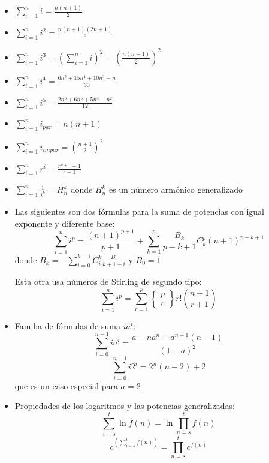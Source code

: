 \begin{itemize}
    \item{
		$ \sum_{i=1}^{n} {i} = \frac{n(n+1)}{2} $	
    }
    \item{
		$ \sum_{i=1}^{n} i^2 = \frac{n(n+1)(2n+1)}{6} $
    }
    \item{
		$ \sum_{i=1}^{n} i^3 = \left( \sum_{i=1}^{n} i \right) ^ 2 = \left( \frac{n(n+1)}{2} \right) ^ 2 $
    }
    \item{
		$ \sum_{i=1}^{n} i^4 = \frac{6n^5 + 15n^4 + 10n^3 - n}{30}$
    }
    \item{
		$ \sum_{i=1}^{n} i^5 = \frac{2n^6 + 6n^5 + 5n^4 - n^2}{12} $
    }
    \item{
		$ \sum_{i=1}^{n} i_{par} = n(n+1) $
    }
    \item{
		$ \sum_{i=1}^{n} i_{impar} = \left( \frac{n+1}{2} \right) ^ 2$
    }
    \item{
		$ \sum_{i=1}^{n} r^i = \frac{r^{n+1} - 1}{r - 1} $
    }
    \item{
		$ \sum_{i=1}^{n} \frac{1}{i^k} = H_n^k $ donde $H_n^k$ es un n\'umero arm\'onico generalizado 
    }
    \item{
        Las siguientes son dos f\'ormulas para la suma de potencias con igual exponente y diferente base:
		$$ \sum_{i=1}^{n} i^p = \frac{(n+1)^{p+1}}{p+1} + \sum_{k=1}^{p} {\frac{B_k}{p-k+1}} C^p_k (n+1)^{p-k+1} $$
		donde 
		$ B_k = - \sum_{i=0}^{k-1} C^k_i \frac{B_i}{k+1-i} $ y $B_0 = 1$
		
		Esta otra usa n\'umeros de Stirling de segundo tipo:
		$$ \sum_{i=1}^n i^p = \sum_{r=1}^p 
		\left\{ \begin{array}{crl}
			p \\ 
			r
        \end{array} \right\}
		r! \binom{n+1}{r+1}
		$$
    }
    \item{
		Familia de f\'ormulas de suma $i a^i$:	
		$$ \sum_{i=0}^{n-1} i a^i = \frac{a - n a^n + a^{n+1} (n-1)}{(1 - a)^ 2} $$
		$$ \sum_{i=0}^{n-1} i 2^i = 2^n (n-2) + 2 $$ que es un caso especial para $a = 2$
    }
    \item{
		Propiedades de los logaritmos y las potencias generalizadas:
		$$ \sum_{i=s}^{t} \ln f(n) = \ln \prod_{n=s}^t f(n) $$
		$$ c^{\left( \sum_{i=s}^{t} f(n)\right)} = \prod_{n=s}^{t} c^{f(n)} $$
    }
\end{itemize}

